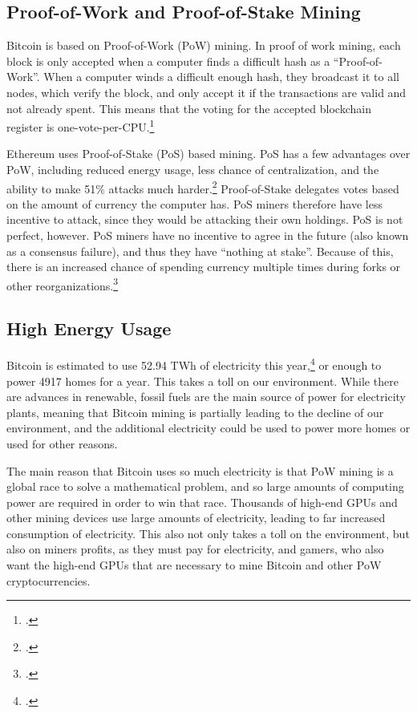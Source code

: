 \documentclass[letter]{article}
\begin{document}
\subsection{Proof-of-Work and Proof-of-Stake Mining}
Bitcoin is based on Proof-of-Work (PoW) mining. In proof of work mining, each block is only accepted when a computer finds a difficult hash as a “Proof-of-Work”. When a computer winds a difficult enough hash, they broadcast it to all nodes, which verify the block, and only accept it if the transactions are valid and not already spent. This means that the voting for the accepted blockchain register is one-vote-per-CPU.\footcite{bitcoin}

Ethereum uses Proof-of-Stake (PoS) based mining. PoS has a few advantages over PoW, including reduced energy usage, less chance of centralization, and the ability to make 51\% attacks much harder.\footcite{ethereum_proof_of_stake} Proof-of-Stake delegates votes based on the amount of currency the computer has. PoS miners therefore have less incentive to attack, since they would be attacking their own holdings. PoS is not perfect, however. PoS miners have no incentive to agree in the future (also known as a consensus failure), and thus they have “nothing at stake”. Because of this, there is an increased chance of spending currency multiple times during forks or other reorganizations.\footcite{potter_2017}

\subsection{High Energy Usage}
Bitcoin is estimated to use 52.94 TWh of electricity this year,\footcite{digiconomist} or enough to power 4917 homes for a year. This takes a toll on our environment. While there are advances in renewable, fossil fuels are the main source of power for electricity plants, meaning that Bitcoin mining is partially leading to the decline of our environment, and the additional electricity could be used to power more homes or used for other reasons.

The main reason that Bitcoin uses so much electricity is that PoW mining is a global race to solve a mathematical problem, and so large amounts of computing power are required in order to win that race. Thousands of high-end GPUs and other mining devices use large amounts of electricity, leading to far increased consumption of electricity. This also not only takes a toll on the environment, but also on miners profits, as they must pay for electricity, and gamers, who also want the high-end GPUs that are necessary to mine Bitcoin and other PoW cryptocurrencies.
\end{document}
